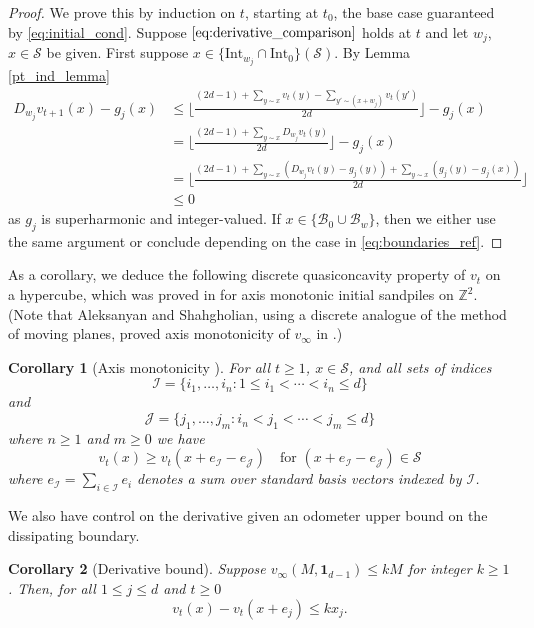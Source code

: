 \documentclass[12pt]{amsart}
\newtheorem{corollary}{Corollary}[section]
\newcommand{\Z}{\mathbb{Z}}
\begin{document}
	\begin{proof}
		We prove this by induction on $t$, starting at $t_0$, the base case guaranteed by \eqref{eq:initial_cond}.
		Suppose $\eqref{eq:derivative_comparison}$ holds at $t$ and let $w_j$, $x \in \mathcal{S}$ be given. 
		First suppose $x \in \{ \mbox{Int}_{w_j} \cap \mbox{Int}_{0} \}(\mathcal{S})$. By Lemma \ref{pt_ind_lemma}
		\begin{align*}
		D_{w_j} v_{t+1}(x) - g_j(x) &\leq \lfloor \frac{(2d -1) + \sum_{y \sim x} v_t(y) - \sum_{y' \sim (x + w_j)} v_t(y')}{2d} \rfloor -  g_j(x) \\
		&=  \lfloor \frac{(2d -1) + \sum_{y \sim x} D_{w_j} v_{t}(y) }{2d} \rfloor -  g_j(x)  \\
		&=  \lfloor \frac{(2d -1) + \sum_{y \sim x} \left( D_{w_j} v_{t}(y) - g_j(y) \right) + \sum_{y \sim x} (g_j(y)-g_j(x))  }{2d} \rfloor  \\
		&\leq  0 
		\end{align*} 
		as $g_j$ is superharmonic and integer-valued.  If $x \in \{ \mathcal{B}_0 \cup \mathcal{B}_{w} \}$, then we either use the same argument or conclude depending on the case in \eqref{eq:boundaries_ref}.
		


	\end{proof}
	
	\noindent As a corollary, we deduce the following discrete quasiconcavity property of $v_t$ on a hypercube, which was proved in \cite{babai2007sandpile}
	for axis monotonic initial sandpiles on $\Z^2$.  (Note that Aleksanyan and Shahgholian, using a discrete analogue of the method of moving planes, proved axis monotonicity
	of $v_{\infty}$ in \cite{aleksanyan2019discrete}.)
	\begin{corollary}[Axis monotonicity \cite{babai2007sandpile}] \label{axis_monotonicity}
		For all $t \geq 1$, $x \in \mathcal{S}$, and all sets of indices 
		\[
		\mathcal{I} = \{ i_1, \ldots, i_n : 1 \leq i_1  < \cdots < i_{n} \leq d \}
		\]
		and
		\[
		\mathcal{J} = \{ j_1, \ldots, j_m : i_n < j_1 < \cdots < j_{m} \leq d \} 
		\]
		where $n \geq 1$ and $m \geq 0$ we have 
		\[
		v_t(x) \geq v_t(x + e_{\mathcal{I}} - e_{\mathcal{J}}) \quad \mbox{for $(x + e_{\mathcal{I}} - e_{\mathcal{J}}) \in \mathcal{S}$}
		\]
		where $e_{\mathcal{I}} = \sum_{i \in \mathcal{I}} e_i$ denotes a sum over standard basis vectors indexed by $\mathcal{I}$.  
	\end{corollary}

	We also have control on the derivative given an odometer upper bound
	on the dissipating boundary. 
		\begin{corollary}[Derivative bound] \label{cor:derivative_bound}
		Suppose $v_{\infty}(M, \mathbf{1}_{d-1}) \leq k M$ for integer $k \geq 1$. 
		Then, for all $1 \leq j \leq d$ and $t \geq 0$
		\begin{equation} \label{eq:cor:derivative_bound}
		v_t(x) - v_t(x+e_j) \leq k x_j.
		\end{equation}

	\end{corollary}
	
\end{document}
